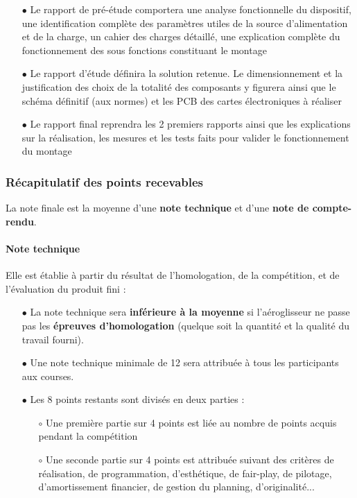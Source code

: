\documentclass[a4paper,12pt]{report}
\begin{document}
			\begin{itemize}
				\item[$\bullet$] Le rapport de pré-étude comportera une analyse fonctionnelle du dispositif, une identification
complète des paramètres utiles de la source d’alimentation et de la charge, un cahier des charges détaillé, une explication complète du fonctionnement des sous fonctions constituant le montage
				\item[$\bullet$] Le rapport d’étude définira la solution retenue. Le dimensionnement et la justification des choix de la totalité des composants y figurera ainsi que le schéma définitif (aux normes) et les PCB des
cartes électroniques à réaliser
				\item[$\bullet$] Le rapport final reprendra les 2 premiers rapports ainsi que les explications sur la réalisation, les mesures et les tests faits pour valider le fonctionnement du montage
			\end{itemize}
			
			\vspace{-1em}
		
			\subsubsection{Récapitulatif des points recevables}
			
			\vspace{-1em}
			
			La note finale est la moyenne d'une \textbf{note technique} et d'une \textbf{note de compte-rendu}.
			
			\vspace{-1.5em}
			
			\paragraph{Note technique}
			
			Elle est établie à partir du résultat de l'homologation, de la compétition, et de l'évaluation du produit fini :
			
			\begin{itemize}
				\item[$\bullet$] La note technique sera \textbf{inférieure à la moyenne} si l'aéroglisseur ne passe pas les \textbf{épreuves d'homologation} (quelque soit la quantité et la qualité du travail fourni).
				\item[$\bullet$] Une note technique minimale de 12 sera attribuée à tous les participants aux courses. 
				\item[$\bullet$] Les 8 points restants sont divisés en deux parties :
				\begin{itemize}
					\item[$\circ$] Une première partie sur 4 points est liée au nombre de points acquis pendant la compétition
					\item[$\circ$] Une seconde partie sur 4 points est attribuée suivant des critères de réalisation, de programmation, d’esthétique, de fair-play, de pilotage, d’amortissement financier, de gestion du planning, d’originalité...
				\end{itemize}
			\end{itemize}
			
\end{document}
